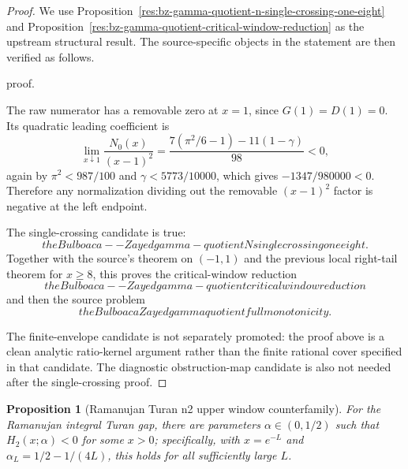 \documentclass[11pt]{article}
\numberwithin{equation}{section}
\newtheorem{proposition}[theorem]{Proposition}
\theoremstyle{definition}
\theoremstyle{remark}
\newcommand{\1}{\mathbf 1}
\begin{document}
\begin{proof}
We use Proposition~\ref{res:bz-gamma-quotient-n-single-crossing-one-eight} and Proposition~\ref{res:bz-gamma-quotient-critical-window-reduction} as the upstream structural result. The source-specific objects in the statement are then verified as follows.

proof.

The raw numerator has a removable zero at \(x=1\), since \(G(1)=D(1)=0\).  Its
quadratic leading coefficient is
\[
\lim_{x\downarrow1}\frac{N_0(x)}{(x-1)^2}
=
\frac{7(\pi^2/6-1)-11(1-\gamma)}{98}<0,
\]
again by \(\pi^2<987/100\) and \(\gamma<5773/10000\), which gives
\(-1347/980000<0\).  Therefore any normalization dividing out the removable
\((x-1)^2\) factor is negative at the left endpoint.

The single-crossing candidate is true:
\[
the Bulboaca--Zayed gamma-quotient N single crossing one eight.
\]
Together with the source's theorem on \((-1,1)\) and the previous local
right-tail theorem for \(x\ge8\), this proves the critical-window reduction
\[
the Bulboaca--Zayed gamma-quotient critical window reduction
\]
and then the source problem
\[
the Bulboaca Zayed gamma quotient full monotonicity.
\]

The finite-envelope candidate is not separately promoted: the proof above is a
clean analytic ratio-kernel argument rather than the finite rational cover
specified in that candidate.  The diagnostic obstruction-map candidate is also
not needed after the single-crossing proof.
\end{proof}

\begin{proposition}[Ramanujan Turan n2 upper window counterfamily]
\label{res:ramanujan-turan-n2-upper-window-counterfamily}
For the Ramanujan integral Turan gap, there are parameters \(\alpha\in(0,1/2)\) such that \(H_2(x;\alpha)<0\) for some \(x>0\); specifically, with \(x=e^{-L}\) and \(\alpha_L=1/2-1/(4L)\), this holds for all sufficiently large \(L\).
\end{proposition}
\end{document}
